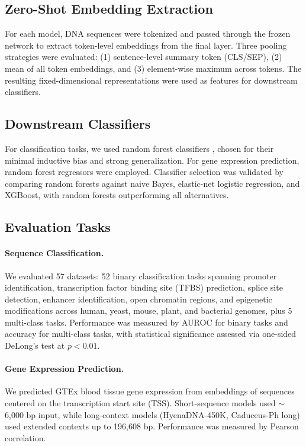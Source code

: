 \documentclass[11pt]{article}
\begin{document}
\subsection{Zero-Shot Embedding Extraction}

For each model, DNA sequences were tokenized and passed through the frozen network to extract token-level embeddings from the final layer. Three pooling strategies were evaluated: (1) sentence-level summary token (CLS/SEP), (2) mean of all token embeddings, and (3) element-wise maximum across tokens. The resulting fixed-dimensional representations were used as features for downstream classifiers.

\subsection{Downstream Classifiers}

For classification tasks, we used random forest classifiers \citep{breiman2001random}, chosen for their minimal inductive bias and strong generalization. For gene expression prediction, random forest regressors were employed. Classifier selection was validated by comparing random forests against naive Bayes, elastic-net logistic regression, and XGBoost, with random forests outperforming all alternatives.

\subsection{Evaluation Tasks}

\paragraph{Sequence Classification.} We evaluated 57 datasets: 52 binary classification tasks spanning promoter identification, transcription factor binding site (TFBS) prediction, splice site detection, enhancer identification, open chromatin regions, and epigenetic modifications across human, yeast, mouse, plant, and bacterial genomes, plus 5 multi-class tasks. Performance was measured by AUROC for binary tasks and accuracy for multi-class tasks, with statistical significance assessed via one-sided DeLong's test \citep{delong1988comparing} at $p < 0.01$.

\paragraph{Gene Expression Prediction.} We predicted GTEx blood tissue gene expression from embeddings of sequences centered on the transcription start site (TSS). Short-sequence models used $\sim$6,000 bp input, while long-context models (HyenaDNA-450K, Caduceus-Ph long) used extended contexts up to 196,608 bp. Performance was measured by Pearson correlation.
\end{document}
